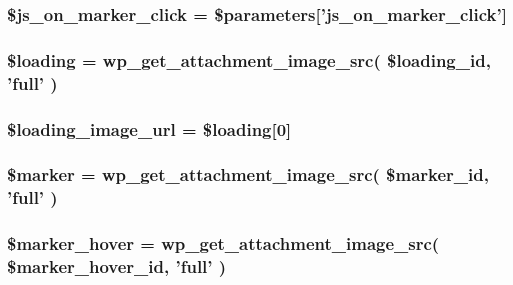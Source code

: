 \label{dc/d04/listings__map_8php_a9b99c2d59610fff900adbf713b636026}
\hypertarget{listings__map_8php_a7d77c6d941846766eabadb49334aff69}{
\subsubsection[{\$js\_\-on\_\-marker\_\-click}]{ \$js\_\-on\_\-marker\_\-click = \$parameters\mbox{[}'js\_\-on\_\-marker\_\-click'\mbox{]}}}
\label{dc/d04/listings__map_8php_a7d77c6d941846766eabadb49334aff69}
\hypertarget{listings__map_8php_a27ac4b0f07ef94fb719218ae92868fd0}{
\subsubsection[{\$loading}]{\setlength{\rightskip}{0pt plus 5cm}\$loading = wp\_\-get\_\-attachment\_\-image\_\-src( \$loading\_\-id, 'full' )}}
\label{dc/d04/listings__map_8php_a27ac4b0f07ef94fb719218ae92868fd0}
\hypertarget{listings__map_8php_ae1ffefca54b4e8c17826b7b3cce5ffd8}{
\subsubsection[{\$loading\_\-image\_\-url}]{\setlength{\rightskip}{0pt plus 5cm}\$loading\_\-image\_\-url = \$loading\mbox{[}0\mbox{]}}}
\label{dc/d04/listings__map_8php_ae1ffefca54b4e8c17826b7b3cce5ffd8}
\hypertarget{listings__map_8php_aad34fbf53cda6bd8a3a9c46764d534fa}{
\subsubsection[{\$marker}]{\setlength{\rightskip}{0pt plus 5cm}\$marker = wp\_\-get\_\-attachment\_\-image\_\-src( \$marker\_\-id, 'full' )}}
\label{dc/d04/listings__map_8php_aad34fbf53cda6bd8a3a9c46764d534fa}
\hypertarget{listings__map_8php_a85d5b478615ed4d6ab296cabe25e9ae4}{
\subsubsection[{\$marker\_\-hover}]{\setlength{\rightskip}{0pt plus 5cm}\$marker\_\-hover = wp\_\-get\_\-attachment\_\-image\_\-src( \$marker\_\-hover\_\-id, 'full' )}}

